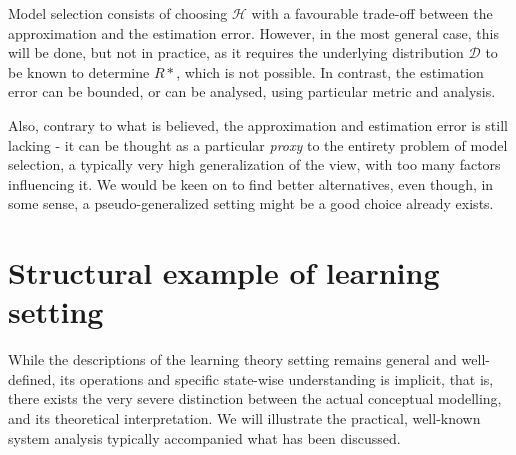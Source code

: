 Model selection consists of choosing $\mathcal{H}$ with a favourable trade-off between the approximation and the estimation error. However, in the most general case, this will be done, but not in practice, as it requires the underlying distribution $\mathcal{D}$ to be known to determine $R{*}$, which is not possible. In contrast, the estimation error can be bounded, or can be analysed, using particular metric and analysis. 

Also, contrary to what is believed, the approximation and estimation error is still lacking - it can be thought as a particular \textit{proxy} to the entirety problem of model selection, a typically very high generalization of the view, with too many factors influencing it. We would be keen on to find better alternatives, even though, in some sense, a pseudo-generalized setting might be a good choice already exists. 

\section{Structural example of learning setting}

While the descriptions of the learning theory setting remains general and well-defined, its operations and specific state-wise understanding is implicit, that is, there exists the very severe distinction between the actual conceptual modelling, and its theoretical interpretation. We will illustrate the practical, well-known system analysis typically accompanied what has been discussed. 

